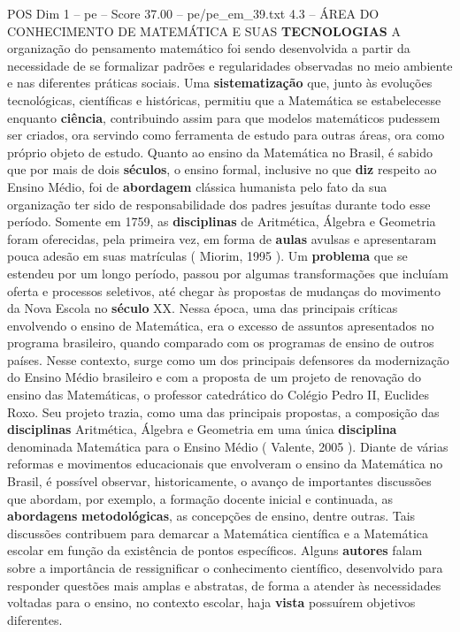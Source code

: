 \begin{textsample}{POS Dim 1 – pe – Score 37.00 – pe/pe\_em\_39.txt}  \label{ex:f1_pos_248}
4.3 – ÁREA DO CONHECIMENTO DE MATEMÁTICA E SUAS \textbf{TECNOLOGIAS} A organização do pensamento matemático foi sendo desenvolvida a partir da necessidade de se formalizar padrões e regularidades observadas no meio ambiente e nas diferentes práticas sociais.
Uma \textbf{sistematização} que, junto às evoluções tecnológicas, científicas e históricas, permitiu que a Matemática se estabelecesse enquanto \textbf{ciência}, contribuindo assim para que modelos matemáticos pudessem ser criados, ora servindo como ferramenta de estudo para outras áreas, ora como próprio objeto de estudo.
Quanto ao ensino da Matemática no Brasil, é sabido que por mais de dois \textbf{séculos}, o ensino formal, inclusive no que \textbf{diz} respeito ao Ensino Médio, foi de \textbf{abordagem} clássica humanista pelo fato da sua organização ter sido de responsabilidade dos padres jesuítas durante todo esse período.
Somente em 1759, as \textbf{disciplinas} de Aritmética, Álgebra e Geometria foram oferecidas, pela primeira vez, em forma de \textbf{aulas} avulsas e apresentaram pouca adesão em suas matrículas ( Miorim, 1995 ).
Um \textbf{problema} que se estendeu por um longo período, passou por algumas transformações que incluíam oferta e processos seletivos, até chegar às propostas de mudanças do movimento da Nova Escola no \textbf{século} XX.
Nessa época, uma das principais críticas envolvendo o ensino de Matemática, era o excesso de assuntos apresentados no programa brasileiro, quando comparado com os programas de ensino de outros países.
Nesse contexto, surge como um dos principais defensores da modernização do Ensino Médio brasileiro e com a proposta de um projeto de renovação do ensino das Matemáticas, o professor catedrático do Colégio Pedro II, Euclides Roxo.
Seu projeto trazia, como uma das principais propostas, a composição das \textbf{disciplinas} Aritmética, Álgebra e Geometria em uma única \textbf{disciplina} denominada Matemática para o Ensino Médio ( Valente, 2005 ).
Diante de várias reformas e movimentos educacionais que envolveram o ensino da Matemática no Brasil, é possível observar, historicamente, o avanço de importantes discussões que abordam, por exemplo, a formação docente inicial e continuada, as \textbf{abordagens} \textbf{metodológicas}, as concepções de ensino, dentre outras.
Tais discussões contribuem para demarcar a Matemática científica e a Matemática escolar em função da existência de pontos específicos.
Alguns \textbf{autores} falam sobre a importância de ressignificar o conhecimento científico, desenvolvido para responder questões mais amplas e abstratas, de forma a atender às necessidades voltadas para o ensino, no contexto escolar, haja \textbf{vista} possuírem objetivos diferentes.

\end{textsample}
